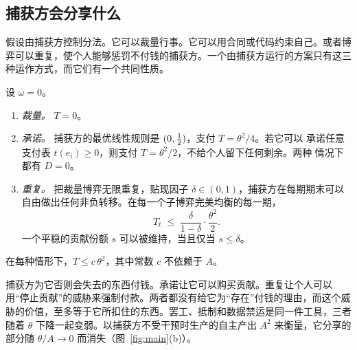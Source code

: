\subsection{捕获方会分享什么}

假设由捕获方控制分法。它可以裁量行事。它可以用合同或代码约束自己。或者博弈可以重复，使个人能够惩罚不付钱的捕获方。一个由捕获方运行的方案只有这三种运作方式，而它们有一个共同性质。

\begin{proposition}[捕获方控制]\label{prop:capt}
设 $\omega=0$。
\begin{enumerate}[label=(\alph*)]
\item \emph{裁量。} $T=0$。
\item \emph{承诺。} 捕获方的最优线性规则是 $(0,\tfrac{1}{2})$，支付 $T=\theta^2/4$。若它可以
      承诺任意支付表 $t(e_i)\ge 0$，则支付 $T=\theta^2/2$，不给个人留下任何剩余。两种
      情况下都有 $D=0$。
\item \emph{重复。} 把裁量博弈无限重复，贴现因子 $\delta\in(0,1)$，捕获方在每期期末可以
      自由做出任何非负转移。在每一个子博弈完美均衡的每一期，
      \begin{equation}\label{eq:bound}
        T_t\;\le\;\frac{\delta}{1-\delta}\cdot\frac{\theta^2}{2}.
      \end{equation}
      一个平稳的贡献份额 $s$ 可以被维持，当且仅当 $s\le\delta$。
\end{enumerate}
在每种情形下，$T\le c\,\theta^2$，其中常数 $c$ 不依赖于 $A$。
\end{proposition}

捕获方为它否则会失去的东西付钱。承诺让它可以购买贡献。重复让个人可以用“停止贡献”的威胁来强制付款。两者都没有给它为“存在”付钱的理由，而这个威胁的价值，至多等于它所扣住的东西。罢工、抵制和数据禁运是同一件工具，三者随着 $\theta$ 下降一起变弱。以捕获方不受干预时生产的自主产出 $A^2$ 来衡量，它分享的部分随 $\theta/A\to 0$ 而消失（图~\ref{fig:main}(b)）。

